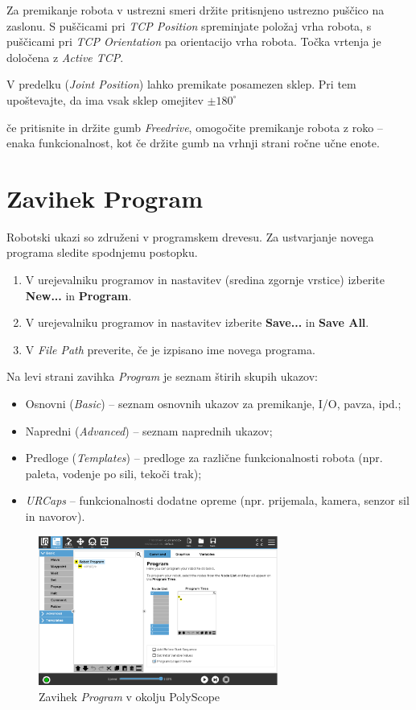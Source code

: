 Za premikanje robota v ustrezni smeri držite pritisnjeno ustrezno puščico na zaslonu. S puščicami pri \emph{TCP Position} spreminjate položaj vrha robota, s puščicami pri \emph{TCP Orientation} pa orientacijo vrha robota. Točka vrtenja je določena z \emph{Active TCP}.

V predelku (\emph{Joint Position}) lahko premikate posamezen sklep. Pri tem upoštevajte, da ima vsak sklep omejitev $\pm 180^\circ$

če pritisnite in držite gumb \emph{Freedrive}, omogočite premikanje robota z roko -- enaka funkcionalnost, kot če držite gumb na vrhnji strani ročne učne enote.

\section{Zavihek Program}

Robotski ukazi so združeni v programskem drevesu. Za ustvarjanje novega programa sledite spodnjemu postopku.

\begin{enumerate}
\item V urejevalniku programov in nastavitev (sredina zgornje vrstice)  izberite \textbf{New...} in \textbf{Program}.
\item V urejevalniku programov in nastavitev izberite \textbf{Save...} in \textbf{Save All}.
\item V \emph{File Path} preverite, če je izpisano ime novega programa.
\end{enumerate}

Na levi strani zavihka \emph{Program} je seznam štirih skupih ukazov:
 \begin{itemize}
   \item Osnovni (\emph{Basic})  -- seznam osnovnih ukazov za premikanje, I/O, pavza, ipd.;
   \item Napredni (\emph{Advanced}) -- seznam naprednih ukazov;
   \item Predloge (\emph{Templates}) -- predloge za različne funkcionalnosti robota (npr. paleta, vodenje po sili, tekoči trak);
   \item \emph{URCaps} -- funkcionalnosti dodatne opreme (npr. prijemala, kamera, senzor sil in navorov).
 \end{itemize}

\begin{figure}[!hbt]
\centering
\includegraphics[width=0.7\textwidth]{ur5e_tab1.eps}
\caption{Zavihek \emph{Program} v okolju PolyScope}
\label{fig:ur_tab1}
\end{figure}

